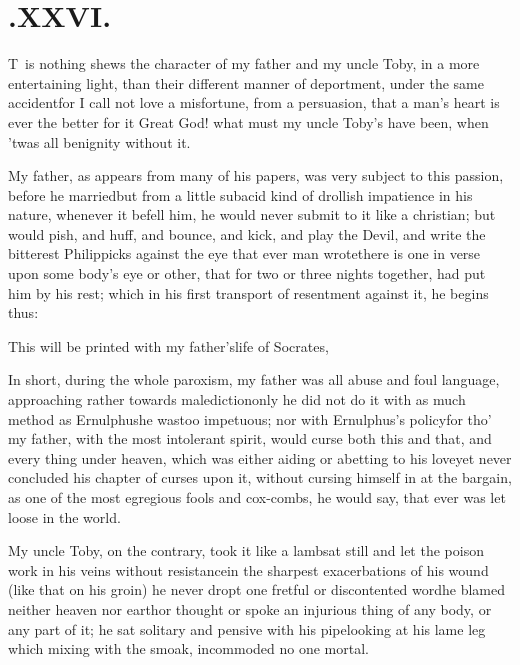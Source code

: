 \documentclass{article}
\begin{document}
\section{.\enspace XXVI.}

\lettrine{T}{\,} is nothing shews the character
of my father and my uncle Toby, in a more entertaining
light, than their different manner of deportment, under the same
accident\tsh for I call not love a misfortune, from a
persuasion, that a man’s heart is ever the better for
it\break
\tsh Great God! what must my uncle Toby’s
have been, when ’twas all benignity without it.

My father, as appears from many of his papers, was very subject
to this passion, before he married\tsh but from a little
subacid kind of drollish impatience in his nature, whenever it
befell him, he would never submit to it like a christian; but would
pish, and huff, and bounce, and kick, and play the Devil, and write
the bitterest Philippicks against the eye that ever man
wrote\tsh there is one in verse upon some body’s eye
or other, that for two or three nights together, had put him by his
rest; which in his first transport of resentment against it, he
begins thus:

\bigskip
\vbox{\fontsize{8}{10}\selectfont{}}

\bgroup\fontsize{9}{11}\selectfont
\indent\fnast\enspace This will be printed with my
father’s\break life of Socrates, \etc \etc\par
\egroup
{}\eject

In short, during the whole paroxism, my father was all abuse and foul language,
approaching rather towards malediction\tsh only he did not do it with as much method
as Ernulphus\tsh he was\break too impetuous; nor with Ernulphus’s policy\tsh for tho’ my
father, with the most intolerant spirit, would curse both this and that, and every
thing under heaven, which was either aiding or abetting to his love\tsh yet never
concluded his chapter of curses upon it, without cursing himself in at the bargain,
as one of the most egregious fools and cox-\break combs, he would say, that ever was let
loose in the world.

My uncle Toby, on the contrary, took it like a
lamb\tsh sat still and let the poison work in his veins
without resistance\tsh in the sharpest exacerbations of
his wound (like that on his groin) he never dropt one fretful or
discontented word\tsh he blamed neither heaven nor
earth\tsh or thought or spoke an inju\-rious thing of any
body, or any part of it; he sat solitary and pensive with his
pipe\tsh looking at his lame leg \tsh\break 
{}
which mixing with the smoak, incommoded no one
mortal.
\end{document}
